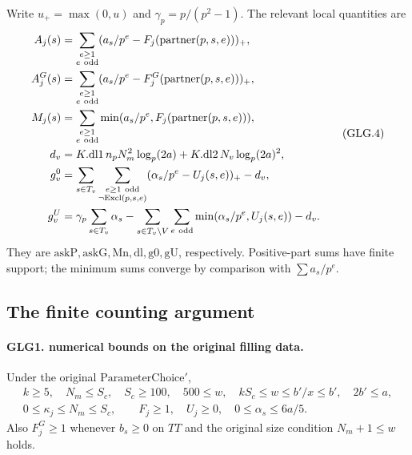 Write \(u_+=\max(0,u)\) and \(\gamma_p=p/(p^2-1)\). The relevant
local quantities are
\[
 \begin{split}
 A_j(s)&=\sum_{\substack{e\ge1\\ e\ {\rm odd}}}
       (a_s/p^e-F_j(\operatorname{partner}(p,s,e)))_+,\\
 A_j^G(s)&=\sum_{\substack{e\ge1\\ e\ {\rm odd}}}
       (a_s/p^e-F_j^G(\operatorname{partner}(p,s,e)))_+,\\
 M_j(s)&=\sum_{\substack{e\ge1\\ e\ {\rm odd}}}
       \min(a_s/p^e,F_j(\operatorname{partner}(p,s,e))),\\
 d_v&=K.\mathrm{dl1}\,n_pN_m^2\log_p(2a)
          +K.\mathrm{dl2}\,N_v\log_p(2a)^2,\\
 g_v^0&=\sum_{s\in T_v}
       \sum_{\substack{e\ge1\ {\rm odd}\\\neg\mathrm{Excl}(p,s,e)}}
          (\alpha_s/p^e-U_j(s,e))_+-d_v,\\
 g_v^U&=\gamma_p\sum_{s\in T_v}\alpha_s
       -\sum_{s\in T_v\setminus V}\sum_{e\ {\rm odd}}
          \min(\alpha_s/p^e,U_j(s,e))-d_v .
 \end{split}                                                       \tag{GLG.4}
\]
They are \(\mathrm{askP},\mathrm{askG},\mathrm{Mn},\mathrm{dl},
\mathrm{g0},\mathrm{gU}\), respectively. Positive-part sums have
finite support; the minimum sums converge by comparison with
\(\sum a_s/p^e\).

\subsection{The finite counting argument}

\paragraph{GLG1. numerical bounds on the original filling data.}
\label{claim:GLG1}
Under the original \(\mathrm{ParameterChoice}'\),
\[
 \begin{gathered}
 k\ge5,\quad N_m\le S_c,\quad S_c\ge100,\quad
 500\le w,\quad kS_c\le w\le b'/x\le b',\quad 2b'\le a,\\
 0\le\kappa_j\le N_m\le S_c,\qquad
 F_j\ge1,\quad U_j\ge0,\quad
 0\le\alpha_s\le6a/5. 
 \end{gathered}                                                     \tag{GLG.5}
\]
Also \(F_j^G\ge1\) whenever \(b_s\ge0\) on \(TT\) and
the original size condition \(N_m+1\le w\) holds.

